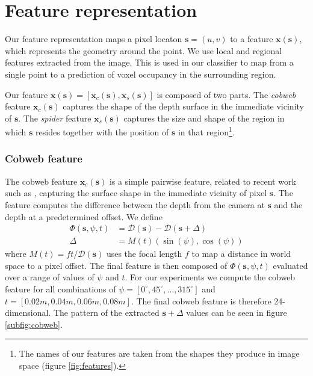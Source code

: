 \documentclass[10pt,twocolumn,letterpaper]{article}
\newcommand{\degree}{^{\circ}}
\newcommand{\rgbdimage}{\mathcal{D}}
\newcommand{\pixelidx}{\mathbf{s}}
\newcommand{\note}[1]{\textcolor{blue}{NOTE: #1}}
\begin{document}
\section{Feature representation}
\label{sec:features}
\newcommand{\feat}{\mathbf{x}}

Our feature representation maps a pixel locaton $\pixelidx = (u, v)$ to a feature $\feat(\pixelidx)$, which represents the geometry around the point.
We use local and regional features extracted from the image.
This is used in our classifier to map from a single point to a prediction of voxel occupancy in the surrounding region.

Our feature $\feat(\pixelidx) = [\feat_c(\pixelidx), \feat_s(\pixelidx)]$ is composed of two parts.
The \emph{cobweb} feature $\feat_c(\pixelidx)$ captures the shape of the depth surface in the immediate vicinity of $\pixelidx$. 
The \emph{spider} feature $\feat_s(\pixelidx)$ captures the size and shape of the region in which $\pixelidx$ resides together with the position of $\pixelidx$ in that region\footnote{The names of our features are taken from the shapes they produce in image space (figure \ref{fig:features}).}.


\subsubsection{Cobweb feature }
The cobweb feature $\feat_c(\pixelidx)$ is a simple pairwise feature, related to recent work such as \cite{shotton-cvpr-2011, tola-pami-2010}, capturing the surface shape in the immediate vicinity of pixel $\pixelidx$.
The feature computes the difference between the depth from the camera at $\pixelidx$ and the depth at a predetermined offset. We define
\begin{align}
\Phi(\pixelidx, \psi, t) &= \rgbdimage(\pixelidx) - \rgbdimage(\pixelidx + \Delta) \\
\Delta &= M(t) (\sin(\psi), \cos(\psi))
\end{align}
where $M(t) = ft / \rgbdimage(\pixelidx)$ uses the focal length $f$ to map a distance in world space to a pixel offset. 
The final feature is then composed of $\Phi(\pixelidx, \psi, t)$ evaluated over a range of values of $\psi$ and $t$.
For our experiments we compute the cobweb feature for all combinations of $\psi = [0\degree, 45\degree, \ldots, 315\degree]$ and $t = [0.02m, 0.04m, 0.06m, 0.08m]$.
The final cobweb feature is therefore 24-dimensional.
The pattern of the extracted $\pixelidx + \Delta$ values can be seen in figure \ref{subfig:cobweb}.
\end{document}
